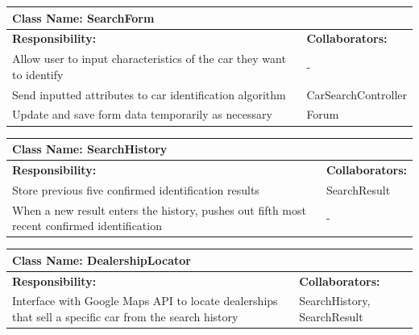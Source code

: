 \documentclass[12pt]{article}
\begin{document}
	\begin{table}[ht]
		\centering
		\begin{tabular}{|p{5cm}|p{5cm}|}
			\hline
			\multicolumn{2}{|l|}{\textbf{Class Name:} SearchForm} \\
			\hline
			\textbf{Responsibility:} & \textbf{Collaborators:} \\
			\hline
			Allow user to input characteristics of the car they want to identify & -\\
			\hline
			Send inputted attributes to car identification algorithm & CarSearchController\\
			\hline
			Update and save form data temporarily as necessary & Forum\\
			\hline
		\end{tabular}
	\end{table}

	\begin{table}[ht]
		\centering
		\begin{tabular}{|p{5cm}|p{5cm}|}
			\hline
			\multicolumn{2}{|l|}{\textbf{Class Name:} SearchHistory} \\
			\hline
			\textbf{Responsibility:} & \textbf{Collaborators:} \\
			\hline
			Store previous five confirmed identification results & SearchResult\\
			\hline
			When a new result enters the history, pushes out fifth most recent confirmed identification & -\\
			\hline
		\end{tabular}
	\end{table}

	\begin{table}[ht]
		\centering
		\begin{tabular}{|p{5cm}|p{5cm}|}
			\hline
			\multicolumn{2}{|l|}{\textbf{Class Name:} DealershipLocator} \\
			\hline
			\textbf{Responsibility:} & \textbf{Collaborators:} \\
			\hline
			Interface with Google Maps API to locate dealerships that sell a specific car from the search history & SearchHistory, SearchResult\\
			\hline
		\end{tabular}
	\end{table}
\end{document}
